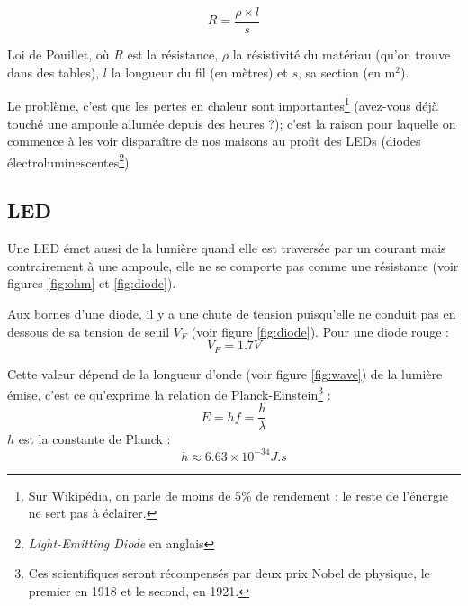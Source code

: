 \documentclass[11pt,a4paper,oneside,twocolumn]{article}
\begin{document}
\begin{equ}[ht]
	\begin{equation*}
		R=\frac{\rho\times l}s
	\end{equation*}
	\caption{Loi de Pouillet, où $R$ est la résistance, $\rho$ la résistivité
	du matériau (qu'on trouve dans des tables), $l$ la longueur du fil (en
	mètres) et $s$, sa section (en $\text{m}^2$).}
	\label{eqn:pouillet}
\end{equ}

Le problème, c'est que les pertes en chaleur sont importantes\footnote{Sur
Wikipédia, on parle de moins de 5\% de rendement : le reste de l'énergie ne
sert pas à éclairer.} (avez-vous déjà touché une ampoule allumée depuis des
heures ?); c'est la raison pour laquelle on commence à les voir disparaître de
nos maisons au profit des LEDs
(diodes électroluminescentes\footnote{\emph{Light-Emitting Diode} en anglais})

\subsection{LED}
Une LED émet aussi de la lumière quand elle est traversée par un courant mais
contrairement à une ampoule, elle ne se comporte pas comme une résistance (voir
figures \ref{fig:ohm} et \ref{fig:diode}).

Aux bornes d'une diode, il y a une chute de tension puisqu'elle ne conduit pas
en dessous de sa tension de seuil $V_F$ (voir figure \ref{fig:diode}).
Pour une diode rouge :
\begin{equation}
	V_F=1.7\si{V}
\end{equation}

Cette valeur dépend de la longueur d'onde (voir figure \ref{fig:wave}) de la
lumière émise, c'est ce qu'exprime la relation de Planck-Einstein\footnote{Ces
scientifiques seront récompensés par deux prix Nobel de physique, le premier en
1918 et le second, en 1921.} :
\begin{equation}
	E=hf=\frac h\lambda
\end{equation}
$h$ est la constante de Planck :
\begin{equation}
h\approx6.63\times10^{-34}\si{J.s}
\end{equation}
\end{document}

